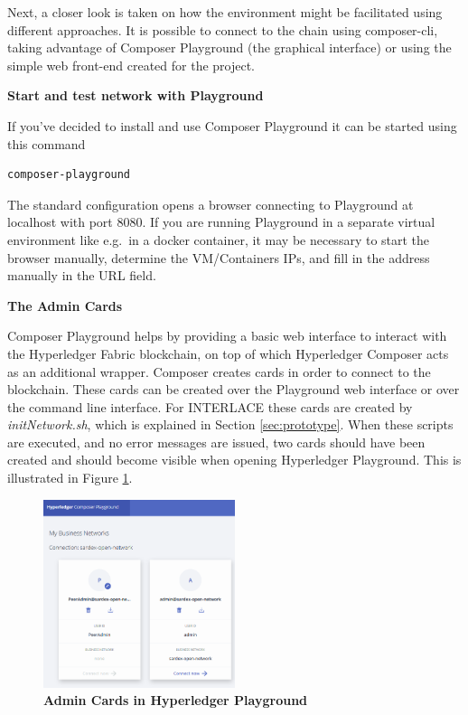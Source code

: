 Next, a closer look is taken on how the environment might be facilitated using different approaches. It is possible to connect to the chain using composer-cli, taking advantage of Composer Playground (the graphical interface) or using the simple web front-end created for the project.

\textbf{Start and test network with Playground}

If you've decided to install and use Composer Playground it can be started using this command

\begin{lstlisting}[language=bash]
	composer-playground
\end{lstlisting}

The standard configuration opens a browser connecting to Playground at localhost with port 8080. If you are running Playground in a separate virtual environment like e.g.\ in a docker container, it may be necessary to start the browser manually, determine the VM/Containers IPs, and fill in the address manually in the URL field.

\textbf{The Admin Cards}

Composer Playground helps by providing a basic web interface to interact with the Hyperledger Fabric blockchain, on top of which Hyperledger Composer acts as an additional wrapper. Composer creates cards in order to connect to the blockchain. These cards can be created over the Playground web interface or over the command line interface. For INTERLACE these cards are created by \textit{initNetwork.sh}, which is explained in Section \ref{sec:prototype}. When these scripts are executed, and no error messages are issued, two cards should have been created and should become visible when opening Hyperledger Playground. This is illustrated in Figure \ref{fig:admin-cards}.

\begin{figure}[htbp]
  \centering
  \includegraphics[width=0.5\textwidth]{Figures/admin-cards}
  \caption{\bf\small Admin Cards in Hyperledger Playground}
  \label{fig:admin-cards}
\end{figure}

